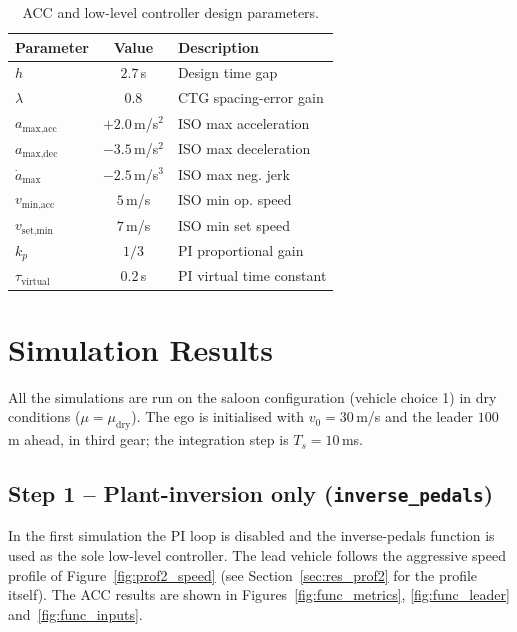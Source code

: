 \begin{table}[H]
    \centering
    \begin{tabular}{lcl}
        \toprule
        \textbf{Parameter} & \textbf{Value} & \textbf{Description} \\
        \midrule
        $h$                & $2.7$\,s             & Design time gap \\
        $\lambda$          & $0.8$                & CTG spacing-error gain \\
        $a_\text{max,acc}$ & $+2.0$\,m/s$^2$      & ISO max acceleration \\
        $a_\text{max,dec}$ & $-3.5$\,m/s$^2$      & ISO max deceleration \\
        $\dot a_\text{max}$& $-2.5$\,m/s$^3$      & ISO max neg. jerk \\
        $v_\text{min,acc}$ & $5$\,m/s             & ISO min op. speed \\
        $v_\text{set,min}$ & $7$\,m/s             & ISO min set speed \\
        $k_p$              & $1/3$                & PI proportional gain \\
        $\tau_\text{virtual}$ & $0.2$\,s          & PI virtual time constant \\
        \bottomrule
    \end{tabular}
    \caption{ACC and low-level controller design parameters.}
    \label{tab:acc_params}
\end{table}

\section{Simulation Results}
All the simulations are run on the saloon configuration (vehicle
choice 1) in dry conditions ($\mu = \mu_\text{dry}$). The ego is
initialised with $v_0 = 30$\,m/s and the leader $100$\,m ahead, in
third gear; the integration step is $T_s = 10$\,ms.

\subsection{Step 1 -- Plant-inversion only (\texttt{inverse\_pedals})}
\label{sec:res_function}
In the first simulation the PI loop is disabled and the inverse-pedals
function is used as the sole low-level controller. The lead vehicle
follows the aggressive speed profile of Figure~\ref{fig:prof2_speed}
(see Section~\ref{sec:res_prof2} for the profile itself). The ACC
results are shown in Figures~\ref{fig:func_metrics},
\ref{fig:func_leader} and~\ref{fig:func_inputs}.

